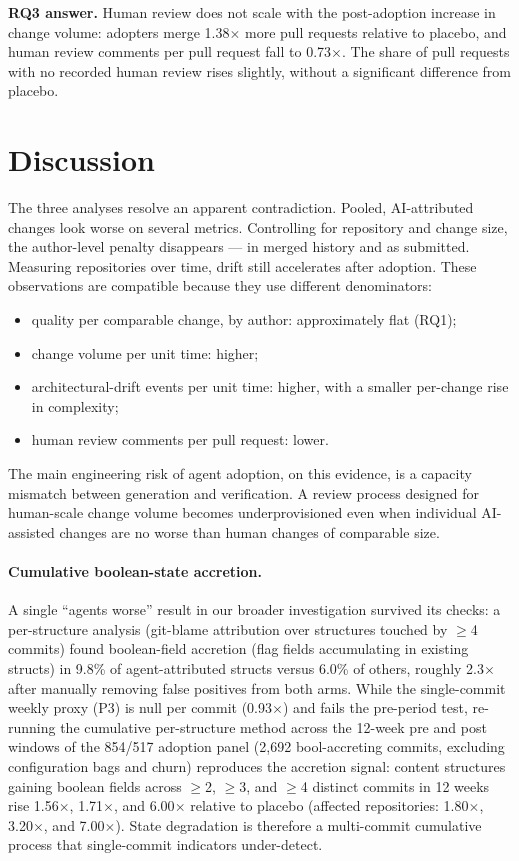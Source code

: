 \documentclass[sigplan,11pt,nonacm=true]{acmart}
\newcommand{\x}{$\times$}
\begin{document}
\medskip
\noindent\textbf{RQ3 answer.} Human review does not scale with the
post-adoption increase in change volume: adopters merge 1.38\x{} more pull
requests relative to placebo, and human review comments per pull request fall
to 0.73\x{}. The share of pull requests with no recorded human review rises
slightly, without a significant difference from placebo.

\section{Discussion}
\label{sec:discussion}

The three analyses resolve an apparent contradiction. Pooled, AI-attributed
changes look worse on several metrics. Controlling for repository and change
size, the author-level penalty disappears --- in merged history and as
submitted. Measuring repositories over time, drift still accelerates after
adoption. These observations are compatible because they use different
denominators:

\begin{itemize}
\item quality per comparable change, by author: approximately flat (RQ1);
\item change volume per unit time: higher;
\item architectural-drift events per unit time: higher, with a smaller
  per-change rise in complexity;
\item human review comments per pull request: lower.
\end{itemize}

The main engineering risk of agent adoption, on this evidence, is a capacity
mismatch between generation and verification. A review process designed for
human-scale change volume becomes underprovisioned even when individual
AI-assisted changes are no worse than human changes of comparable size.

\paragraph{Cumulative boolean-state accretion.} A single ``agents worse'' result in
our broader investigation survived its checks: a per-structure analysis
(git-blame attribution over structures touched by $\ge$4 commits) found
boolean-field accretion (flag fields accumulating in existing structs) in
9.8\% of agent-attributed structs versus 6.0\% of others, roughly 2.3\x{}
after manually removing false positives from both arms. While the single-commit
weekly proxy (P3) is null per commit (0.93\x{}) and fails the pre-period test,
re-running the cumulative per-structure method across the 12-week pre and post
windows of the 854/517 adoption panel (2{,}692 bool-accreting commits,
excluding configuration bags and churn) reproduces the accretion signal:
content structures gaining boolean fields across $\ge$2, $\ge$3, and $\ge$4
distinct commits in 12 weeks rise 1.56\x{}, 1.71\x{}, and 6.00\x{} relative to
placebo (affected repositories: 1.80\x{}, 3.20\x{}, and 7.00\x{}). State
degradation is therefore a multi-commit cumulative process that single-commit
indicators under-detect.
\end{document}
